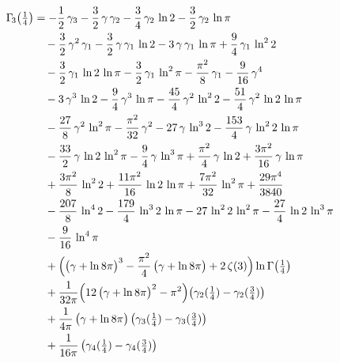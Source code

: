 \begin{align*}
\Gamma_{\!3}\bigl(\tfrac14\bigr) &= -\frac{1}{2}\,\gamma_{3}-\frac{3}{2}\,\gamma\,\gamma_{2}-\frac{3}{4}\,\gamma_{2}\,\ln 2-\frac{3}{2}\,\gamma_{2}\,\ln \pi \\
 &\quad -\frac{3}{2}\,\gamma^{2}\,\gamma_{1}-\frac{3}{2}\,\gamma\,\gamma_{1}\,\ln 2-3\,\gamma\,\gamma_{1}\,\ln \pi+\frac{9}{4}\,\gamma_{1}\,\ln^{2} 2 \\
 &\quad -\frac{3}{2}\,\gamma_{1}\,\ln 2\,\ln \pi-\frac{3}{2}\,\gamma_{1}\,\ln^{2} \pi-\frac{\pi^{2}}{8}\,\gamma_{1}-\frac{9}{16}\,\gamma^{4} \\
 &\quad -3\,\gamma^{3}\,\ln 2-\frac{9}{4}\,\gamma^{3}\,\ln \pi-\frac{45}{4}\,\gamma^{2}\,\ln^{2} 2-\frac{51}{4}\,\gamma^{2}\,\ln 2\,\ln \pi \\
 &\quad -\frac{27}{8}\,\gamma^{2}\,\ln^{2} \pi-\frac{\pi^{2}}{32}\,\gamma^{2}-27\,\gamma\,\ln^{3} 2-\frac{153}{4}\,\gamma\,\ln^{2} 2\,\ln \pi \\
 &\quad -\frac{33}{2}\,\gamma\,\ln 2\,\ln^{2} \pi-\frac{9}{4}\,\gamma\,\ln^{3} \pi+\frac{\pi^{2}}{4}\,\gamma\,\ln 2+\frac{3\pi^{2}}{16}\,\gamma\,\ln \pi \\
 &\quad +\frac{3\pi^{2}}{8}\,\ln^{2} 2+\frac{11\pi^{2}}{16}\,\ln 2\,\ln \pi+\frac{7\pi^{2}}{32}\,\ln^{2} \pi+\frac{29\pi^{4}}{3840} \\
 &\quad -\frac{207}{8}\,\ln^{4} 2-\frac{179}{4}\,\ln^{3} 2\,\ln \pi-27\,\ln^{2} 2\,\ln^{2} \pi-\frac{27}{4}\,\ln 2\,\ln^{3} \pi \\
 &\quad -\frac{9}{16}\,\ln^{4} \pi \\
 &\quad +\Bigl(\bigl(\gamma+\ln 8\pi\bigr)^{3}-\frac{\pi^{2}}{4}\,\bigl(\gamma+\ln 8\pi\bigr)+2\,\zeta(3)\Bigr)\ln\Gamma\bigl(\tfrac14\bigr) \\
 &\quad +\frac{1}{32\pi}\Bigl(12\,\bigl(\gamma+\ln 8\pi\bigr)^{2}-\pi^{2}\Bigr)\bigl(\gamma_{2}(\tfrac14)-\gamma_{2}(\tfrac34)\bigr) \\
 &\quad +\frac{1}{4\pi}\,\bigl(\gamma+\ln 8\pi\bigr)\,\bigl(\gamma_{3}(\tfrac14)-\gamma_{3}(\tfrac34)\bigr) \\
 &\quad +\frac{1}{16\pi}\,\bigl(\gamma_{4}(\tfrac14)-\gamma_{4}(\tfrac34)\bigr)
\end{align*}









